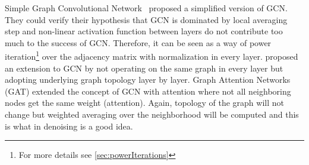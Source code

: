 Simple Graph Convolutional Network~\cite{simpleGCN} proposed a simplified version of GCN.
They could verify their hypothesis that GCN is dominated by local averaging step and non-linear 
activation function between layers do not contribute too much to the success of GCN. 
Therefore, it can be seen as a way of power iteration\footnote{For more details see \ref{sec:powerIterations}}
over the adjacency matrix with normalization in every layer.
\citet{dynamicGCN} proposed an extension to GCN by not operating on the same graph in every layer but adopting
underlying graph topology layer by layer.
Graph Attention Networks (GAT) \cite{GAT} extended the concept of GCN with attention where not
all neighboring nodes get the same weight (attention).
Again, topology of the graph will not change but weighted averaging over the neighborhood 
will be computed and this is what in denoising is a good idea.
